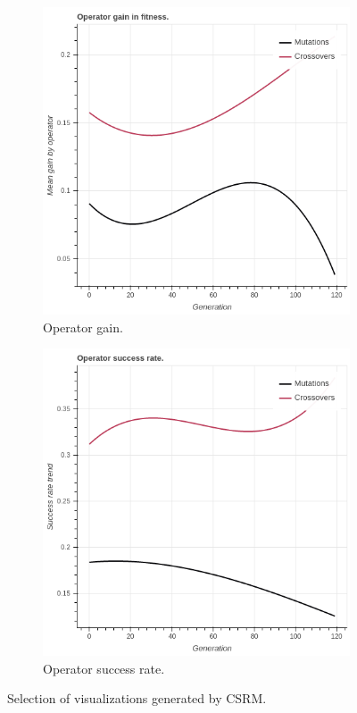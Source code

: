\begin{figure}
\begin{subfigure}{0.5\textwidth}
    \centering
        \includegraphics[width=0.8\linewidth]{figures/viz_operatorgaintrend.png}
        \caption{Operator gain.}
    \end{subfigure}%
    \begin{subfigure}{0.5\textwidth}
    \centering
        \includegraphics[width=0.8\linewidth]{figures/viz_operatorsuccessratetrend.png}
        \caption{Operator success rate.}
    \end{subfigure}
    \caption{Selection of visualizations generated by CSRM.}
    \label{fig:viz}
\end{figure}

%
